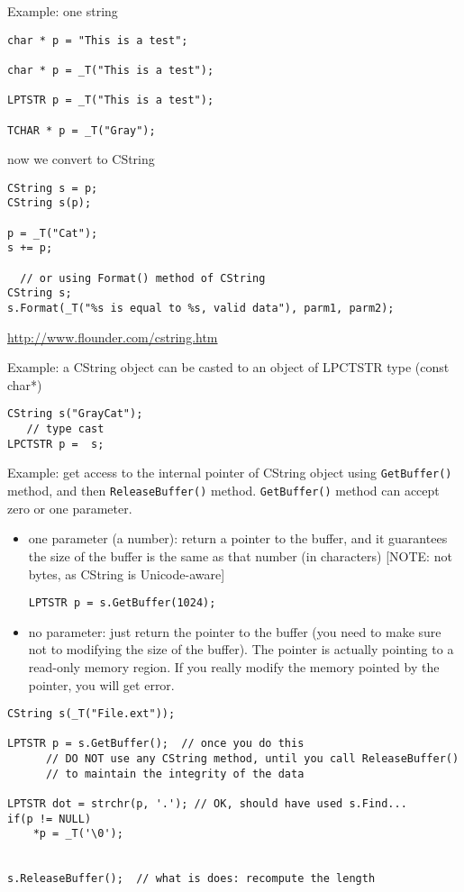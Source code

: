 Example: one string
\begin{verbatim}
char * p = "This is a test";

char * p = _T("This is a test");

LPTSTR p = _T("This is a test");

TCHAR * p = _T("Gray");
\end{verbatim}

now we convert to CString
\begin{verbatim}
CString s = p;
CString s(p);

p = _T("Cat");
s += p;

  // or using Format() method of CString
CString s;
s.Format(_T("%s is equal to %s, valid data"), parm1, parm2);  
\end{verbatim}

\url{http://www.flounder.com/cstring.htm}


Example: a CString object can be casted to an object of LPCTSTR type (const
char*)
\begin{verbatim}
CString s("GrayCat");
   // type cast
LPCTSTR p =  s;
\end{verbatim}


Example: get access to the internal pointer of CString object using
\verb!GetBuffer()! method, and then \verb!ReleaseBuffer()! method.
\verb!GetBuffer()! method can accept zero or one parameter.
\begin{itemize}
  \item one parameter (a number): return a pointer to the buffer, and it
  guarantees the size of the buffer is the same as that number (in characters)
  [NOTE: not bytes, as CString is Unicode-aware]
\begin{verbatim}
LPTSTR p = s.GetBuffer(1024);
\end{verbatim}  

  \item no parameter: just return the pointer to the buffer (you need to make
  sure not to modifying the size of the buffer). The pointer is actually
  pointing to a read-only memory region. If you really modify the memory
  pointed by the pointer, you will get error.
  
\end{itemize}
\begin{verbatim}
CString s(_T("File.ext"));
  
LPTSTR p = s.GetBuffer();  // once you do this
      // DO NOT use any CString method, until you call ReleaseBuffer()
      // to maintain the integrity of the data
      
LPTSTR dot = strchr(p, '.'); // OK, should have used s.Find...
if(p != NULL)
    *p = _T('\0');
    
    
s.ReleaseBuffer();  // what is does: recompute the length
\end{verbatim}


